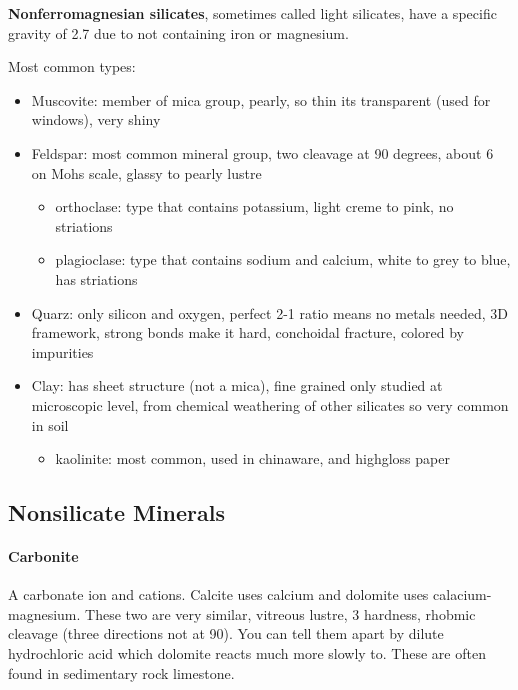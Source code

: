 \documentclass{article}
\begin{document}
\textbf{Nonferromagnesian silicates}, sometimes called light silicates, have a specific gravity of 2.7 due to not containing iron or magnesium.

Most common types:
\begin{itemize}
    \item Muscovite: member of mica group, pearly, so thin its transparent (used for windows), very shiny
    \item Feldspar: most common mineral group, two cleavage at 90 degrees, about 6 on Mohs scale, glassy to pearly lustre
    \begin{itemize}
        \item orthoclase: type that contains potassium, light creme to pink, no striations
        \item plagioclase: type that contains sodium and calcium, white to grey to blue, has striations
    \end{itemize}
    \item Quarz: only silicon and oxygen, perfect 2-1 ratio means no metals needed, 3D framework, strong bonds make it hard, conchoidal fracture, colored by impurities
    \item Clay: has sheet structure (not a mica), fine grained only studied at microscopic level, from chemical weathering of other silicates so very common in soil
    \begin{itemize}
        \item kaolinite: most common, used in chinaware, and highgloss paper
    \end{itemize}
\end{itemize}


\subsection{Nonsilicate Minerals} %
\label{sub:nonsilicate_minerals}
\paragraph{Carbonite} %
\label{par:carbonite}
A carbonate ion and cations. Calcite uses calcium and dolomite uses calacium-magnesium. These two are very similar, vitreous lustre, 3 hardness, rhobmic cleavage (three directions not at 90). You can tell them apart by dilute hydrochloric acid which dolomite reacts much more slowly to. These are often found in sedimentary rock limestone.
\end{document}
